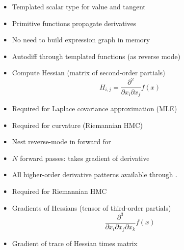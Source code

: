 \documentclass[10pt]{report}
\begin{document}
%
\begin{itemize}
\item Templated scalar type for value and tangent
\item Primitive functions propagate derivatives
\item No need to build expression graph in memory
\item Autodiff through templated functions (as reverse mode)
\end{itemize}

%
\begin{itemize}
\item Compute Hessian (matrix of second-order partials)
\[
H_{i,j} = \frac{\partial^2}{\partial x_i \partial x_j} f(x)
\]
\item Required for Laplace covariance approximation (MLE)
\item Required for curvature (Riemannian HMC)
\item Nest reverse-mode in forward for 
\item $N$ forward passes: takes gradient of derivative
\item All higher-order derivative patterns available through .
\end{itemize}



%
\begin{itemize}
\item Required for Riemannian HMC
\item Gradients of Hessians (tensor of third-order partials)
\[
\frac{\partial^3}{\partial x_i \partial x_j \partial x_k} f(x)
\]
\vspace*{-12pt}
\end{itemize}


%
\begin{itemize}
\item Gradient of trace of Hessian times matrix
\end{itemize}
\end{document}
